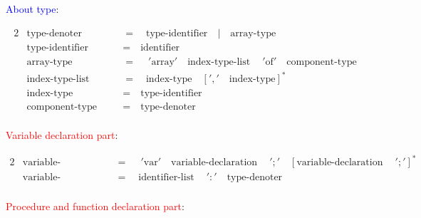 \documentclass{article}
\begin{document}
\textcolor{blue}{About type}:

\begin{alignat*}{2}
&\text{type-denoter}\quad&&=\quad\text{type-identifier}\quad|\quad\text{array-type}\\
&\text{type-identifier}\quad&&=\quad\text{identifier}\\
&\text{array-type}\quad&&=\quad\ '\text{array}'\quad\text{index-type-list}\quad\ '\text{of}'\quad\text{component-type}\\
&\text{index-type-list}\quad&&=\quad\text{index-type}\quad{[','\quad\text{index-type}]}^*\\
&\text{index-type}\quad&&=\quad\text{type-identifier}\\
&\text{component-type}\quad&&=\quad\text{type-denoter}\\
\end{alignat*}

\textcolor{red}{Variable declaration part}:

\begin{alignat*}{2}
&\text{variable-declaration-part}\quad&&=\quad\ '\text{var}'\quad\text{variable-declaration}\quad\ ';'\quad {[\text{variable-declaration}\quad\ ';']}^* \\
&\text{variable-declaration}\quad&&=\quad\text{identifier-list}\quad\ ':' \quad\text{type-denoter}\\
\end{alignat*}

\newpage

\textcolor{red}{Procedure and function declaration part}:
\end{document}
